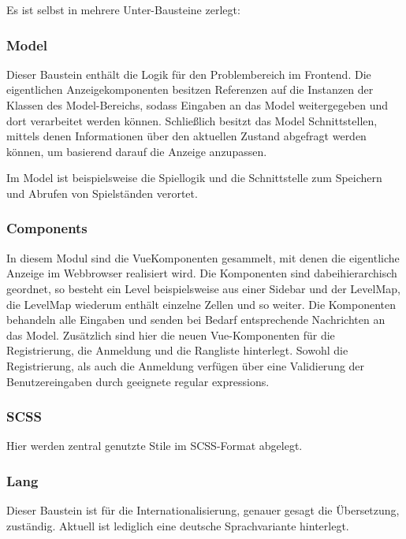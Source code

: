 \documentclass[letterpaper, 10 pt, conference]{ieeeconf}
\begin{document}
Es ist selbst in mehrere Unter-Bausteine zerlegt:

\subsubsection{Model}

Dieser Baustein enthält die Logik für den Problembereich im Frontend.
Die eigentlichen Anzeigekomponenten besitzen Referenzen auf die Instanzen der Klassen des Model-Bereichs,
sodass Eingaben an das Model weitergegeben und dort verarbeitet werden können.
Schließlich besitzt das Model Schnittstellen, mittels denen Informationen über den aktuellen Zustand abgefragt werden können,
um basierend darauf die Anzeige anzupassen.

Im Model ist beispielsweise die Spiellogik und die Schnittstelle zum Speichern und Abrufen von Spielständen verortet.

\subsubsection{Components}

In diesem Modul sind die VueKomponenten gesammelt, mit denen die eigentliche Anzeige im Webbrowser realisiert wird.
Die Komponenten sind dabeihierarchisch geordnet, so besteht ein Level beispielsweise aus einer Sidebar und der LevelMap, die LevelMap wiederum enthält einzelne Zellen und so weiter.
Die Komponenten behandeln alle Eingaben und senden bei Bedarf entsprechende Nachrichten an das Model.
Zusätzlich sind hier die neuen Vue-Komponenten für die Registrierung, die Anmeldung und die Rangliste hinterlegt.
Sowohl die Registrierung, als auch die Anmeldung verfügen über eine Validierung der Benutzereingaben durch geeignete regular expressions.

\subsubsection{SCSS}

Hier werden zentral genutzte Stile im SCSS-Format abgelegt.

\subsubsection{Lang}

Dieser Baustein ist für die Internationalisierung, genauer gesagt die Übersetzung, zuständig.
Aktuell ist lediglich eine deutsche Sprachvariante hinterlegt.
\end{document}
